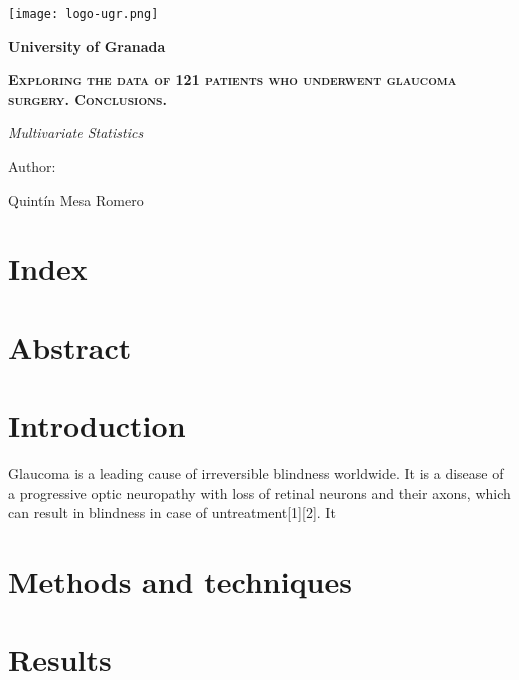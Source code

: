 \documentclass{article}
\begin{document}
\begin{titlepage}
\centering
\vspace{1cm}
{\texttt{[image: logo-ugr.png]}\par}
\vspace{1cm}
{\bfseries\LARGE University of Granada \par}
\vspace{1cm}
{\scshape\Huge \textbf{Exploring the data of 121 patients who underwent glaucoma surgery. Conclusions.}  \par}
\vspace{1cm}
{\itshape\Large Multivariate Statistics \par}
\vspace{1.2cm}
{\Large Author:\par}

Quintín Mesa Romero \par


\end{titlepage}

\section{Index}
\section{Abstract}
\section{Introduction}


Glaucoma is a leading cause of irreversible blindness worldwide. It is a disease of 
a progressive optic neuropathy with loss of retinal neurons and their axons, which can
result in blindness in case of untreatment[1][2]. It 


\section{Methods and techniques}
\section{Results}
\end{document}
